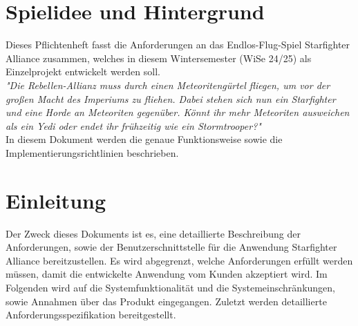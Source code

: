 \documentclass[10pt]{article}
\newcounter{FAcounter}
\newcounter{NFAcounter}
\begin{document}
\newcommand{\NFA}[6]{
	\refstepcounter{NFAcounter}
    \noindent
    \begin{tcolorbox}[
        colframe=unilogo,           
        colback=unilogo!10,        
        boxrule=0.5pt,              
        left=2mm, right=2mm, top=1mm, bottom=1mm, 
        rounded corners=all,        
    ]
        \begin{tabularx}{\textwidth}{l|X}
            \rowcolor{unilogo} \textbf{\textcolor{white}{ID}} & \textbf{\textcolor{white}{NFA \theNFAcounter}} \\
            \hline
            \textbf{TITEL:} & #1 \\
            \hline
            \textbf{BESCHREIBUNG:} & #2 \\
            \hline
            \textbf{BEGRÜNDUNG:} & #3 \\ 
            \hline
            \textbf{ABHÄNGIGKEITEN:} & #4 \\
            \hline
            \textbf{RISIKEN:} & #5 \\
        \end{tabularx}
    \end{tcolorbox}
    \vspace{15pt}\par
}

\newpage
    \section{Spielidee und Hintergrund}
Dieses Pflichtenheft fasst die Anforderungen an das Endlos-Flug-Spiel Starfighter Alliance zusammen, welches
in diesem Wintersemester (WiSe 24/25) als Einzelprojekt entwickelt werden soll.\\
\textit{"Die Rebellen-Allianz muss durch einen Meteoritengürtel fliegen, um vor der großen Macht des
Imperiums zu fliehen. Dabei stehen sich nun ein Starfighter und eine Horde an Meteoriten gegenüber.
Könnt ihr mehr Meteoriten ausweichen als ein Yedi oder endet ihr frühzeitig wie ein Stormtrooper?"}\footnotemark[1]\\
In diesem Dokument werden die genaue Funktionsweise sowie die Implementierungsrichtlinien
beschrieben.


    \section{Einleitung}
Der Zweck dieses Dokuments ist es, eine detaillierte Beschreibung der Anforderungen, sowie der Benutzerschnittstelle für die Anwendung Starfighter Alliance bereitzustellen. Es wird abgegrenzt, welche Anforderungen erfüllt werden müssen, damit die entwickelte Anwendung vom Kunden akzeptiert wird. Im Folgenden wird auf die Systemfunktionalität und die Systemeinschränkungen, sowie Annahmen über das Produkt eingegangen. Zuletzt werden detaillierte Anforderungsspezifikation bereitgestellt.
\end{document}
